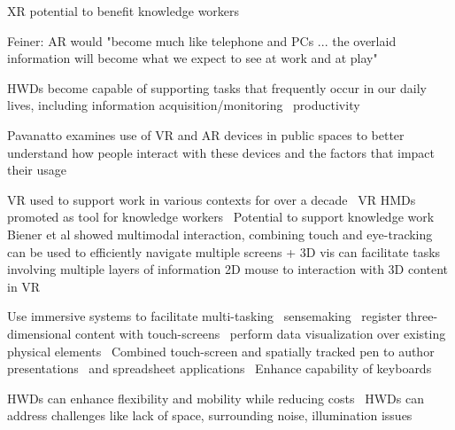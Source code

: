 XR potential to benefit knowledge workers \cite{pavanatto2024xrwild, bellgardt2017vrwork, mcguffin2019augmented} 


Feiner: AR would "become much like telephone and PCs ... the overlaid information will become what we expect to see at work and at play"~\cite{feiner2002ar}

HWDs become capable of supporting tasks that frequently occur in our daily lives, including information acquisition/monitoring~\cite{lindlbauer2019contextaware,lu2020glanceable}
productivity~\cite{biener2022vrweek,biener2020breakingscreen,cheng2021semanticadapt,lisle2020evaluatingimmersivethink,pavanatto2021virtualmonitor}

Pavanatto examines use of VR and AR devices in public spaces to better understand how people interact with these devices and the factors that impact their usage \cite{pavanatto2024xrwild}

VR used to support work in various contexts for over a decade~\cite{biener2024holdtight} 
VR HMDs promoted as tool for knowledge workers~\cite{ofek2020practicalvirtualofficemobile} %
Potential to support knowledge work \cite{biener2024holdtight}
Biener et al showed multimodal interaction, combining touch and eye-tracking can be used to efficiently navigate multiple screens + 3D vis can facilitate tasks involving multiple layers of information \cite{biener2022povrpoint,biener2020breakingscreen} 
2D mouse to interaction with 3D content in VR \cite{zhou2022indepthmouse} 


Use immersive systems to facilitate multi-tasking~\cite{ens2014personalcockpit}
sensemaking~\cite{kobayashi2021xrspace, lisle2021immersivethink,lisle2020evaluatingimmersivethink,tahmid2022immersivesensemaking} 
register three-dimensional content with touch-screens~\cite{le2021vxslate,biener2020breakingscreen}
perform data visualization over existing physical elements~\cite{butscher2018collaborativeanalysis,mahmood2017bdva,reipschlager2021arlargedisplaysinfovis}
Combined touch-screen and spatially tracked pen to author presentations~\cite{biener2022povrpoint}
and spreadsheet applications~\cite{gesslein2020spreadsheet}
Enhance capability of keyboards~\cite{reconviguration2019schneider} 


HWDs can enhance flexibility and mobility while reducing costs~\cite{pavanatto2021virtualmonitor}
HWDs can address challenges like lack of space, surrounding noise, illumination issues~\cite{gruber2018officefuture,ofek2020practicalvirtualofficemobile}

